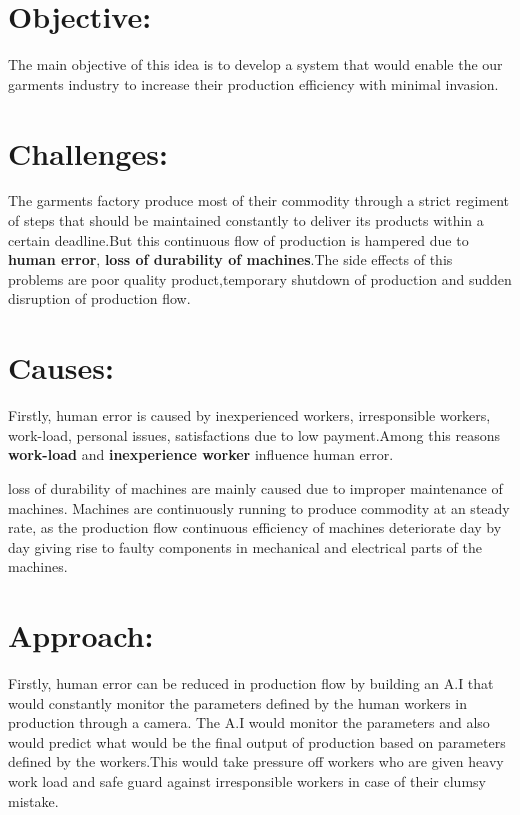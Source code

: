 \documentclass{article}
\begin{document}
    \begin{normalsize}
    
    	\section{Objective:}
        
        The main objective of this idea is to develop a system that would enable the our garments industry to increase their production efficiency with minimal invasion. 
  
      
		\section{Challenges:}
        
       The garments factory produce most of their commodity through a strict regiment of steps that should be maintained constantly to deliver its products within a certain deadline.But this continuous flow of production is hampered due to \textbf{ human error}, \textbf{ loss of durability of machines}.The side effects of this problems are poor quality product,temporary shutdown of production and sudden disruption of production flow.   
        
	   	\section{Causes:}
        
      Firstly, human error is caused by inexperienced workers, irresponsible workers, work-load, personal issues, satisfactions due to low payment.Among this reasons \textbf{work-load} and \textbf{inexperience worker} influence human error.
      
      loss of durability of machines are mainly caused due to improper maintenance of machines. Machines are continuously running to produce commodity at an steady rate, as the production flow continuous efficiency of machines deteriorate day by day giving rise to faulty components in mechanical and electrical parts of the machines.
      
       \section{Approach:}
        
      Firstly, human error can be reduced in production flow by building an A.I that would constantly monitor the parameters defined by the human workers in production through a camera. The A.I would monitor the parameters and also would predict what would be the final output of production based on parameters defined by the workers.This would take pressure off workers who are given heavy work load and safe guard against irresponsible workers in case of their clumsy mistake. 
      

\end{normalsize}
\end{document}

